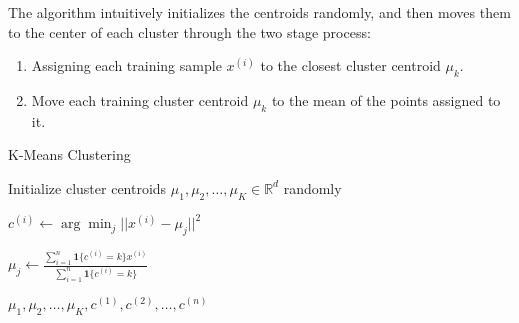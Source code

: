   \begin{algo}
    The algorithm intuitively initializes the centroids randomly, and then moves them to the center of each cluster through the two stage process: 
    \begin{enumerate}
      \item Assigning each training sample $x^{(i)}$ to the closest cluster centroid $\mu_k$. 
      \item Move each training cluster centroid $\mu_k$ to the mean of the points assigned to it. 
    \end{enumerate}
    \begin{algorithm}[H]
    \caption{K-Means Clustering}
    \label{alg:kmeans}
    \begin{algorithmic}[1]
          
      
      \State Initialize cluster centroids $\mu_1, \mu_2, \ldots, \mu_K \in \mathbb{R}^d$ randomly
      
      \Repeat
          \State $c^{(i)} \gets \arg\min_j ||x^{(i)} - \mu_j||^2$
        \EndFor
        
          \State $\mu_j \gets \frac{\sum_{i=1}^n \mathbf{1}\{c^{(i)} = k\} x^{(i)}}{\sum_{i=1}^n \mathbf{1}\{c^{(i)} = k\}}$
        \EndFor
      
      \State \Return $\mu_1, \mu_2, \ldots, \mu_K, c^{(1)}, c^{(2)}, \ldots, c^{(n)}$
      \EndProcedure
    \end{algorithmic}
    \end{algorithm}
  \end{algo} 

